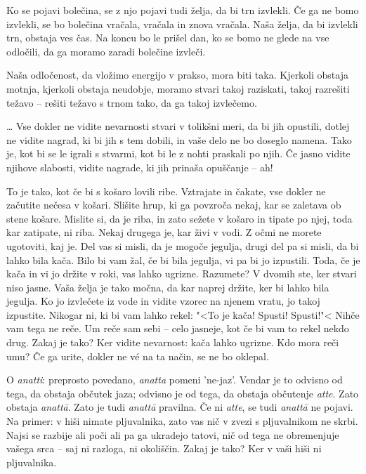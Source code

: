 Ko se pojavi bolečina, se z njo pojavi tudi želja, da bi trn izvlekli. Če ga ne bomo izvlekli, se bo bolečina vračala, vračala in znova vračala. Naša želja, da bi izvlekli trn, obstaja ves čas. Na koncu bo le prišel dan, ko se bomo ne glede na vse odločili, da ga moramo zaradi bolečine izvleči.

Naša odločenost, da vložimo energijo v prakso, mora biti taka. Kjerkoli obstaja motnja, kjerkoli obstaja neudobje, moramo stvari takoj raziskati, takoj razrešiti težavo – rešiti težavo s trnom tako, da ga takoj izvlečemo.

\clearpage


\ldots{} Vse dokler ne vidite nevarnosti stvari v tolikšni meri, da bi jih opustili, dotlej ne vidite nagrad, ki bi jih s tem dobili, in vaše delo ne bo doseglo namena. Tako je, kot bi se le igrali s stvarmi, kot bi le z nohti praskali po njih. Če jasno vidite njihove slabosti, vidite nagrade, ki jih prinaša opuščanje – ah!

To je tako, kot če bi s košaro lovili ribe. Vztrajate in čakate, vse dokler ne začutite nečesa v košari. Slišite hrup, ki ga povzroča nekaj, kar se zaletava ob stene košare. Mislite si, da je riba, in zato sežete v košaro in tipate po njej, toda kar zatipate, ni riba. Nekaj drugega je, kar živi v vodi. Z očmi ne morete ugotoviti, kaj je. Del vas si misli, da je mogoče jegulja, drugi del pa si misli, da bi lahko bila kača. Bilo bi vam žal, če bi bila jegulja, vi pa bi jo izpustili. Toda, če je kača in vi jo držite v roki, vas lahko ugrizne. Razumete? V dvomih ste, ker stvari niso jasne. Vaša želja je tako močna, da kar naprej držite, ker bi lahko bila jegulja. Ko jo izvlečete iz vode in vidite vzorec na njenem vratu, jo takoj izpustite. Nikogar ni, ki bi vam lahko rekel: "<To je kača! Spusti! Spusti!"< Nihče vam tega ne reče. Um reče sam sebi – celo jasneje, kot če bi vam to rekel nekdo drug. Zakaj je tako? Ker vidite nevarnost: kača lahko ugrizne. Kdo mora reči umu? Če ga urite, dokler ne vé na ta način, se ne bo oklepal.

\clearpage


O \emph{anatti}: preprosto povedano, \emph{anatta} pomeni 'ne-jaz'. Vendar je to odvisno od tega, da obstaja občutek jaza; odvisno je od tega, da obstaja občutenje \emph{atte}. Zato obstaja \emph{anattā}. Zato je tudi \emph{anattā} pravilna. Če ni \emph{atte}, se tudi \emph{anattā} ne pojavi. Na primer: v hiši nimate pljuvalnika, zato vas nič v zvezi s pljuvalnikom ne skrbi. Najsi se razbije ali poči ali pa ga ukradejo tatovi, nič od tega ne obremenjuje vašega srca – saj ni razloga, ni okoliščin. Zakaj je tako? Ker v vaši hiši ni pljuvalnika.

